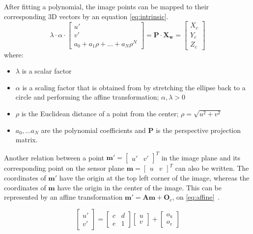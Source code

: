 After fitting a polynomial, the image points can be mapped to their corresponding 3D vectors by an equation \ref{eq:intrinsic}.
\begin{equation}
	\lambda \cdot \alpha \cdot
	\begin{bmatrix}
		u' \\
		v' \\
		a_0 + a_1 \rho + \dots + a_{N} \rho^{N} 
	\end{bmatrix}
	= \mathbf{P} \cdot \mathbf{X_w} = %
	\begin{bmatrix}
		X_c \\
		Y_c \\
		Z_c
	\end{bmatrix}
	\label{eq:intrinsic}
\end{equation}
where:
\begin{itemize}
\item{$\lambda$ is a scalar factor}
\item{$\alpha$ is a scaling factor that is obtained from  by stretching the ellipse back to a circle and performing
the affine transformation; $\alpha, \lambda > 0$}
\item{$\rho$ is the Euclidean distance of a point from the center; $\rho = \sqrt{u^2 + v^2}$}
\item{$a_0, \dots a_N$ are the polynomial coefficients and $\mathbf{P}$ is 
the perspective projection matrix.}
\end{itemize}

Another relation between a point $\textbf{m}' = \begin{bmatrix} u' & v' \end{bmatrix}^{T}$ in the image plane
and its corresponding point on the sensor plane $\textbf{m} = \begin{bmatrix} u & v \end{bmatrix}^{T}$ can also be written. The coordinates of
$\textbf{m}'$ have the origin at the top left corner of the image, whereas the coordinates of $\textbf{m}$ have the origin in the center of the image.
This can be represented by an affine transformation $\textbf{m}' = \textbf{Am} + \textbf{O}_c$, on \ref{eq:affine}~\cite{URBAN201572}.

\begin{equation}
	\begin{bmatrix}
		u' \\
		v'
	\end{bmatrix}
	= 
	\begin{bmatrix}
		c & d \\
		e & 1
	\end{bmatrix}
	\begin{bmatrix}
		u \\
		v
	\end{bmatrix}
	+
	\begin{bmatrix}
		o_u \\
		o_v
	\end{bmatrix}
\label{eq:affine}
\end{equation}

